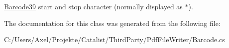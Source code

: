 \hyperlink{class_pdf_file_writer_1_1_barcode39}{Barcode39} start and stop character (normally displayed as $\ast$). 



The documentation for this class was generated from the following file\+:\begin{DoxyCompactItemize}
\item 
C\+:/\+Users/\+Axel/\+Projekte/\+Catalist/\+Third\+Party/\+Pdf\+File\+Writer/Barcode.\+cs\end{DoxyCompactItemize}
